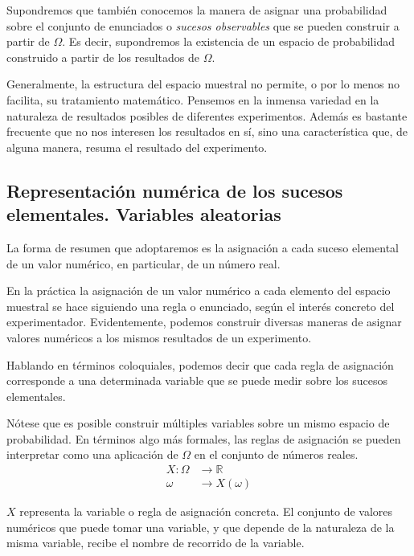 \documentclass[
]{article}
\begin{document}
Supondremos que también conocemos la manera de asignar una probabilidad
sobre el conjunto de enunciados o \emph{sucesos observables} que se pueden
construir a partir de \(\Omega\). Es decir, supondremos la existencia de
un espacio de probabilidad construido a partir de los resultados de
\(\Omega\).

Generalmente, la estructura del espacio muestral no permite, o por lo
menos no facilita, su tratamiento matemático. Pensemos en la inmensa
variedad en la naturaleza de resultados posibles de diferentes
experimentos. Además es bastante frecuente que no nos interesen los
resultados en sí, sino una característica que, de alguna manera, resuma
el resultado del experimento.

\subsection{Representación numérica de los sucesos elementales. Variables aleatorias}\label{representaciuxf3n-numuxe9rica-de-los-sucesos-elementales.-variables-aleatorias}

La forma de resumen que adoptaremos es la asignación a cada suceso
elemental de un valor numérico, en particular, de un número real.

En la práctica la asignación de un valor numérico a cada elemento del
espacio muestral se hace siguiendo una regla o enunciado, según el
interés concreto del experimentador. Evidentemente, podemos construir
diversas maneras de asignar valores numéricos a los mismos resultados de
un experimento.

Hablando en términos coloquiales, podemos decir que cada regla de
asignación corresponde a una determinada variable que se puede medir
sobre los sucesos elementales.

Nótese que es posible construir múltiples variables sobre un mismo
espacio de probabilidad. En términos algo más formales, las reglas de
asignación se pueden interpretar como una aplicación de \(\Omega\) en el
conjunto de números reales. \[
\begin{aligned}
X: \Omega & \rightarrow \mathbb{R} \\
\omega & \rightarrow X(\omega)
\end{aligned}
\]

\(X\) representa la variable o regla de asignación concreta. El conjunto
de valores numéricos que puede tomar una variable, y que depende de la
naturaleza de la misma variable, recibe el nombre de recorrido de la
variable.
\end{document}
